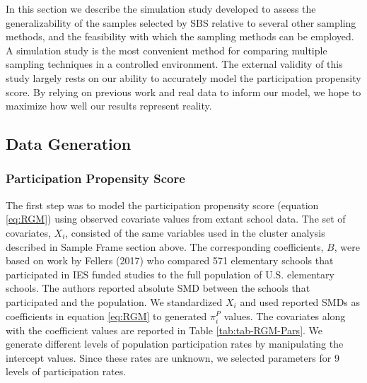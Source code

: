 \documentclass[man,floatsintext]{apa6}
\begin{document}
In this section we describe the simulation study developed to assess the generalizability of the samples selected by SBS relative to several other sampling methods, and the feasibility with which the sampling methods can be employed. A simulation study is the most convenient method for comparing multiple sampling techniques in a controlled environment. The external validity of this study largely rests on our ability to accurately model the participation propensity score. By relying on previous work and real data to inform our model, we hope to maximize how well our results represent reality.

\hypertarget{data-generation}{%
\subsection{Data Generation}\label{data-generation}}

\hypertarget{participation-propensity-score}{%
\subsubsection{Participation Propensity Score}\label{participation-propensity-score}}

The first step was to model the participation propensity score (equation \eqref{eq:RGM}) using observed covariate values from extant school data. The set of covariates, \(X_i\), consisted of the same variables used in the cluster analysis described in Sample Frame section above. The corresponding coefficients, \(B\), were based on work by Fellers (2017) who compared 571 elementary schools that participated in IES funded studies to the full population of U.S. elementary schools. The authors reported absolute SMD between the schools that participated and the population. We standardized \(X_i\) and used reported SMDs as coefficients in equation \eqref{eq:RGM} to generated \(\pi^P_i\) values. The covariates along with the coefficient values are reported in Table \ref{tab:tab-RGM-Pars}. We generate different levels of population participation rates by manipulating the intercept values. Since these rates are unknown, we selected parameters for 9 levels of participation rates.
\end{document}
